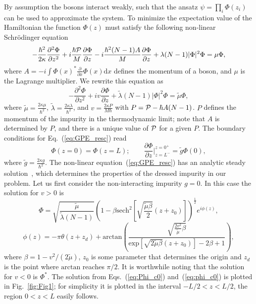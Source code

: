 \documentclass[reprint, twocolumn,amsmath,amssymb,showpacs,pra,superscriptaddress,aps]{revtex4-1}
\begin{document}
By assumption the bosons interact weakly, such that the ansatz $\psi=\prod_i \Phi(z_i)$ can be used to approximate the system. 
To minimize the expectation value of the Hamiltonian the function $\Phi(z)$ must satisfy the following non-linear Schr{\"o}dinger equation
\begin{equation}
-\frac{\hbar^2}{2\kappa}\frac{\partial^2\Phi}{\partial z^2}+i\frac{\hbar {\cal P}}{M}\frac{\partial \Phi}{\partial z}
-i \frac{\hbar^2 (N-1) A}{M} \frac{\partial\Phi}{\partial z} + \lambda (N-1)|\Phi|^2\Phi=\mu \Phi,
\end{equation}
where $A=-i\int \Phi(x)^*\frac{\partial}{\partial x}\Phi(x)\mathrm{d}x$ defines the momentum of a boson, and $\mu$ is the Lagrange multiplier. 
We rewrite this equation as
\begin{equation}
-\frac{\partial^2\Phi}{\partial z^2}+i v \frac{\partial \Phi}{\partial z} + \tilde \lambda (N-1)|\Phi|^2\Phi=\tilde\mu\Phi,
\label{eq:GPE_resc}
\end{equation}
where $\tilde\mu=\frac{2 \kappa \mu}{\hbar^2}$, $\tilde \lambda =\frac{2 \kappa \lambda}{\hbar^2}$, and 
$v= \frac{2 \kappa P}{M \hbar}$ with $P={\cal P}-\hbar A(N-1)$. $P$ defines the momentum of the impurity in the thermodynamic limit;
note that $A$ is determined by $P$, and there is a unique value of ${\cal P}$ for a given $P$.
The boundary conditions for Eq.~(\ref{eq:GPE_resc}) read
\begin{equation}
\Phi(z=0)=\Phi(z=L); \qquad \frac{\partial \Phi}{\partial z}\bigg|^{z=0^+}_{z=L^-}= \tilde g \Phi(0),
\end{equation}
where $\tilde g= \frac{2\kappa g}{\hbar^2}$. The non-linear equation~(\ref{eq:GPE_resc}) 
has an analytic steady solution~\cite{hakim1997}, which determines the properties 
of the dressed impurity in our problem. Let us first consider the non-interacting impurity $g=0$. 
In this case the solution for $v>0$ is~\cite{tsuzuki1971, ishikawa1980}
\begin{equation}
\Phi=\sqrt{\frac{\tilde \mu}{\tilde \lambda (N-1)}}\left(1-\beta \mathrm{sech}^2\left[\sqrt{\frac{\tilde\mu\beta}{2}}(z+z_0)\right]\right)^{\frac{1}{2}}e^{i\phi(z)},
\label{eq:Phi_c0}
\end{equation}
\begin{equation}
\phi(z)=-\pi\theta(z+z_d)+\mathrm{arctan}\left(\frac{\sqrt{\frac{2 v^2}{\tilde \mu}\beta}}{\mathrm{exp}\left[\sqrt{2\tilde \mu\beta}(z+z_0)\right]-2\beta+1}\right),
\label{eq:phi_c0}
\end{equation}
where  $\beta=1- v^2/(2\tilde \mu)$, $z_0$ is some parameter that determines the origin and $z_d$ is the point where $\mathrm{arctan}$ reaches $\pi/2$.
 It is worthwhile noting that the solution for $v<0$ is $\Phi^*$. 
The solution from Eqs.~(\ref{eq:Phi_c0}) and~(\ref{eq:phi_c0}) is plotted in Fig.~\ref{fig:Fig1}; 
for simplicity it is plotted in the interval $-L/2<z<L/2$, the region $0<z<L$ easily follows. 
\end{document}
